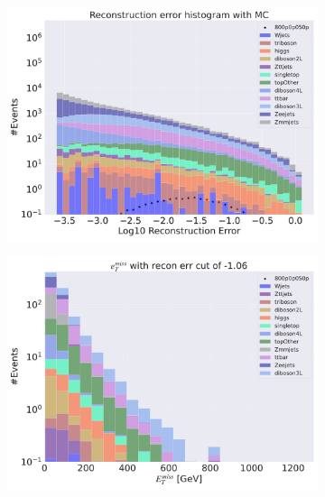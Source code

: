 \begin{figure}[H]
    \centering
    \begin{subfigure}{.40\textwidth}
        \includegraphics[width=\textwidth]{Figures/AE_testing/small/3lep/b_data_recon_big_rm3_feats_sig_800p0p050p.pdf}
        \caption{ }
        \label{fig:AE_3lep_small_800_2}
    \end{subfigure}
    \hfill
    \begin{subfigure}{.40\textwidth}
        \includegraphics[width=\textwidth]{Figures/AE_testing/small/3lep/b_data_recon_big_rm3_feats_sig_800p0p050p_etmiss_recon_errcut_-1.06.pdf}
        \caption{}
        \label{fig:AE_3lep_small_etmiss_800_2}
    \end{subfigure}

\end{figure}
